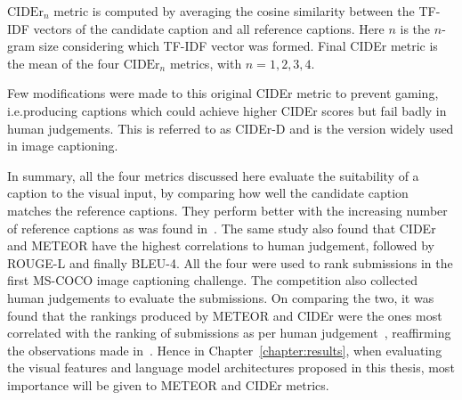 $\text{CIDEr}_n$ metric is computed by averaging the cosine similarity between
the TF-IDF vectors of the candidate caption and all reference captions.
Here $n$ is the $n$-gram size considering which TF-IDF vector was formed.
Final CIDEr metric is the mean of the four $\text{CIDEr}_n$ metrics, with $n=1,2,3,4$.

Few modifications were made to this original CIDEr metric to prevent gaming,
i.e.\@ producing captions which could achieve higher CIDEr scores but fail badly
in human judgements.
This is referred to as CIDEr-D and is the version widely used in image
captioning.

\bigskip
In summary, all the four metrics discussed here evaluate the suitability of a
caption to the visual input, by comparing how well the candidate caption
matches the reference captions.
They perform better with the increasing number of reference captions as was
found in~\cite{Vedantam_2015_CVPR}.
The same study also found that CIDEr and METEOR have the highest correlations
to human judgement, followed by ROUGE-L and finally BLEU-4.
All the four were used to rank submissions in the first MS-COCO
image captioning challenge.
The competition also collected human judgements to evaluate the submissions.
%
On comparing the two, it was found that the rankings produced by METEOR and
CIDEr were the ones most correlated with the ranking of submissions as per human
judgement~\cite{lsun2015CaptionSlides}, reaffirming the observations made
in~\cite{Vedantam_2015_CVPR}.
Hence in Chapter~\ref{chapter:results}, when evaluating the visual features and
language model architectures proposed in this thesis, most importance will be
given to METEOR and CIDEr metrics.
